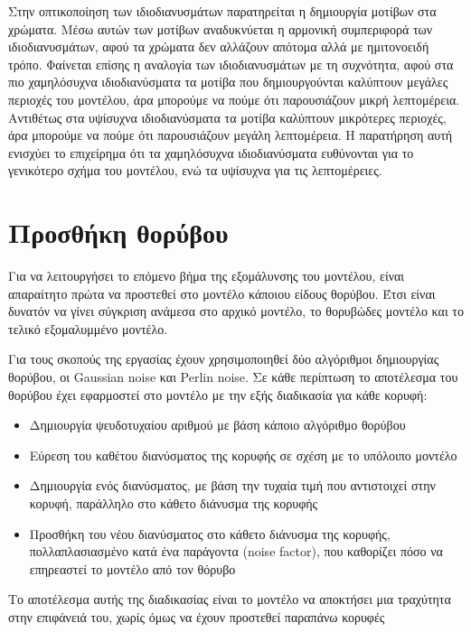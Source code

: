 \documentclass{article}
\begin{document}
Στην οπτικοποίηση των ιδιοδιανυσμάτων παρατηρείται η δημιουργία μοτίβων στα χρώματα.
Μέσω αυτών των μοτίβων αναδυκνύεται η αρμονική συμπεριφορά των ιδιοδιανυσμάτων, αφού τα
χρώματα δεν αλλάζουν απότομα αλλά με ημιτονοειδή τρόπο. Φαίνεται επίσης η αναλογία
των ιδιοδιανυσμάτων με τη συχνότητα, αφού στα πιο χαμηλόσυχνα ιδιοδιανύσματα
τα μοτίβα που δημιουργούνται καλύπτουν μεγάλες περιοχές του μοντέλου, άρα μπορούμε
να πούμε ότι παρουσιάζουν μικρή λεπτομέρεια. Αντιθέτως στα υψίσυχνα ιδιοδιανύσματα τα μοτίβα
καλύπτουν μικρότερες περιοχές, άρα μπορούμε να πούμε ότι παρουσιάζουν μεγάλη λεπτομέρεια.
Η παρατήρηση αυτή ενισχύει το επιχείρημα ότι τα χαμηλόσυχνα ιδιοδιανύσματα ευθύνονται για
το γενικότερο σχήμα του μοντέλου, ενώ τα υψίσυχνα για τις λεπτομέρειες.


\section{Προσθήκη θορύβου}
Για να λειτουργήσει το επόμενο βήμα της εξομάλυνσης του μοντέλου,
είναι απαραίτητο πρώτα να προστεθεί στο μοντέλο κάποιου είδους θορύβου.
Έτσι είναι δυνατόν να γίνει σύγκριση ανάμεσα στο αρχικό μοντέλο,
το θορυβώδες μοντέλο και το τελικό εξομαλυμμένο μοντέλο.

Για τους σκοπούς της εργασίας έχουν χρησιμοποιηθεί δύο αλγόριθμοι
δημιουργίας θορύβου, οι Gaussian noise και Perlin noise.
Σε κάθε περίπτωση το αποτέλεσμα του θορύβου έχει εφαρμοστεί στο
μοντέλο με την εξής διαδικασία για κάθε κορυφή:

\begin{itemize}
	\item Δημιουργία ψευδοτυχαίου αριθμού με βάση κάποιο αλγόριθμο θορύβου
	\item Εύρεση του καθέτου διανύσματος της κορυφής σε σχέση με το υπόλοιπο μοντέλο
	\item Δημιουργία ενός διανύσματος, με βάση την τυχαία τιμή που αντιστοιχεί στην
		κορυφή, παράλληλο στο κάθετο διάνυσμα της κορυφής
	\item Προσθήκη του νέου διανύσματος στο κάθετο διάνυσμα της κορυφής,
		πολλαπλασιασμένο κατά ένα παράγοντα (noise factor),
		που καθορίζει πόσο να επηρεαστεί το μοντέλο από τον θόρυβο
\end{itemize}

Το αποτέλεσμα αυτής της διαδικασίας είναι το μοντέλο να αποκτήσει μια τραχύτητα στην
επιφάνειά του, χωρίς όμως να έχουν προστεθεί παραπάνω κορυφές
\end{document}
